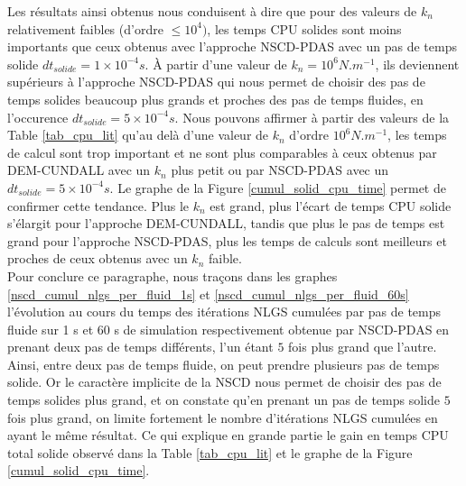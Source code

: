 Les résultats ainsi obtenus nous conduisent à dire que pour des valeurs de $k_n$ relativement faibles (d'ordre $\le 10^4)$, les temps CPU solides sont moins importants que ceux obtenus avec l'approche NSCD-PDAS avec un pas de temps solide $dt_{solide} = 1\times10^{-4} s$. À partir d'une valeur de $k_n = 10^6 N.m^{-1}$, ils deviennent supérieurs à l'approche NSCD-PDAS qui nous permet de choisir des pas de temps solides beaucoup plus grands et proches des pas de temps fluides, en l'occurence $dt_{solide} = 5\times10^{-4} s$. Nous pouvons affirmer à partir des valeurs de la Table \ref{tab_cpu_lit} qu'au delà d'une valeur de $k_n$ d'ordre $10^6 N.m^{-1}$,  les temps de calcul  sont trop important et ne sont plus comparables à ceux obtenus par DEM-CUNDALL avec un $k_n$ plus petit ou par NSCD-PDAS avec un $dt_{solide} = 5\times10^{-4} s$. Le graphe de la Figure \ref{cumul_solid_cpu_time} permet de confirmer cette tendance. Plus le $k_n$ est grand, plus l'écart de temps CPU solide s'élargit pour l'approche DEM-CUNDALL, tandis que plus le pas de temps est grand pour l'approche NSCD-PDAS, plus les temps de calculs sont meilleurs et proches de ceux obtenus avec un $k_n$ faible.\\

Pour conclure ce paragraphe, nous traçons dans les graphes \ref{nscd_cumul_nlgs_per_fluid_1s} et \ref{nscd_cumul_nlgs_per_fluid_60s} l'évolution au cours du temps des itérations NLGS cumulées par pas de temps fluide sur 1 s et 60 s de simulation respectivement obtenue par NSCD-PDAS en prenant deux pas de temps différents, l'un étant $5$ fois plus grand que l'autre. Ainsi, entre deux pas de temps fluide, on peut prendre plusieurs pas de temps solide. Or le caractère implicite de la NSCD nous permet de choisir des pas de temps solides plus grand, et on constate qu'en prenant un pas de temps solide $5$ fois plus grand, on limite fortement le nombre d'itérations NLGS cumulées en ayant le même résultat. Ce qui explique en grande partie le gain en temps CPU total solide observé dans la Table \ref{tab_cpu_lit} et le graphe de la Figure \ref{cumul_solid_cpu_time}.

